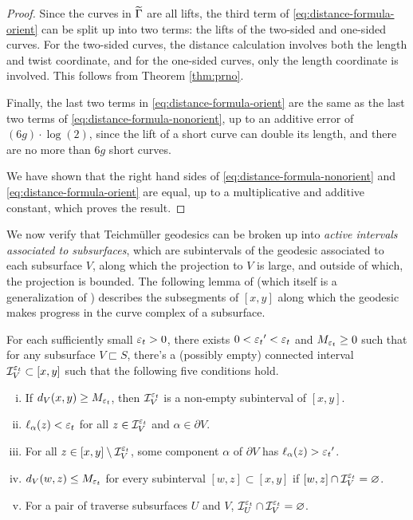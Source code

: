 \documentclass[12pt, reqno]{amsart}
\begin{document}
\begin{proof}
Since the curves in $\widetilde{\Gamma}$ are all lifts, the third term of \eqref{eq:distance-formula-orient} can be split up into two terms: the lifts of the two-sided and one-sided curves.
For the two-sided curves, the distance calculation involves both the length and twist coordinate, and for the one-sided curves, only the length coordinate is involved.
This follows from Theorem \ref{thm:prno}.

Finally, the last two terms in \eqref{eq:distance-formula-orient} are the same as the last two terms of \eqref{eq:distance-formula-nonorient}, up to an additive error of $(6g) \cdot \log(2)$, since the lift of a short curve can double its length, and there are no more than $6g$ short curves.

We have shown that the right hand sides of \eqref{eq:distance-formula-nonorient} and \eqref{eq:distance-formula-orient} are equal, up to a multiplicative and additive constant, which proves the result.
\end{proof}

We now verify that Teichmüller geodesics can be broken up into \emph{active intervals associated to subsurfaces}, which are subintervals of the geodesic associated to each subsurface $V$, along which the projection to $V$ is large, and outside of which, the projection is bounded.
The following lemma  of \textcite[Lemma 3.26]{dowdall2023lattice} (which itself is a generalization of \textcite[Proposition 3.7]{rafi2007combinatorial}) describes the subsegments of $[x,y]$ along which the geodesic makes progress in the curve complex of a subsurface.

\begin{proposition}
  \label{thm:active-intervals}
  For each sufficiently small $\varepsilon_t > 0$, there exists $0 < {\varepsilon_t}^{\prime} < \varepsilon_t$ and $M_{\varepsilon_t} \geq 0$ such that for any subsurface $V \sqsubset S$, there's a (possibly empty) connected interval $\mathcal{I}_V^{\varepsilon_t} \subset [x,y]$ such that the following five conditions hold.
  \begin{enumerate}[(i)]
  \item If $d_V(x, y) \geq M_{\varepsilon_t}$, then $\mathcal{I}_V^{{\varepsilon_t}}$ is a non-empty subinterval of $[x,y]$.
  \item $\ell_\alpha(z) < {\varepsilon_t}$ for all $z \in \mathcal{I}_V^{{\varepsilon_t}}$ and $\alpha \in \partial V$.
  \item For all $z \in [x,y] \setminus \mathcal{I}_V^{{\varepsilon_t}}$, some component $\alpha$ of $\partial V$ has $\ell_\alpha(z) > {\varepsilon_t}^{\prime}$.
  \item $d_V(w, z) \leq M_{\varepsilon_t}$ for every subinterval $[w,z] \subset [x,y]$ if $[w,z] \cap \mathcal{I}_V^{\varepsilon_t} = \varnothing$.
  \item For a pair of traverse subsurfaces $U$ and $V$, $\mathcal{I}_U^{\varepsilon_t} \cap \mathcal{I}_V^{\varepsilon_t} = \varnothing$.
  \end{enumerate}
\end{proposition}
\end{document}
